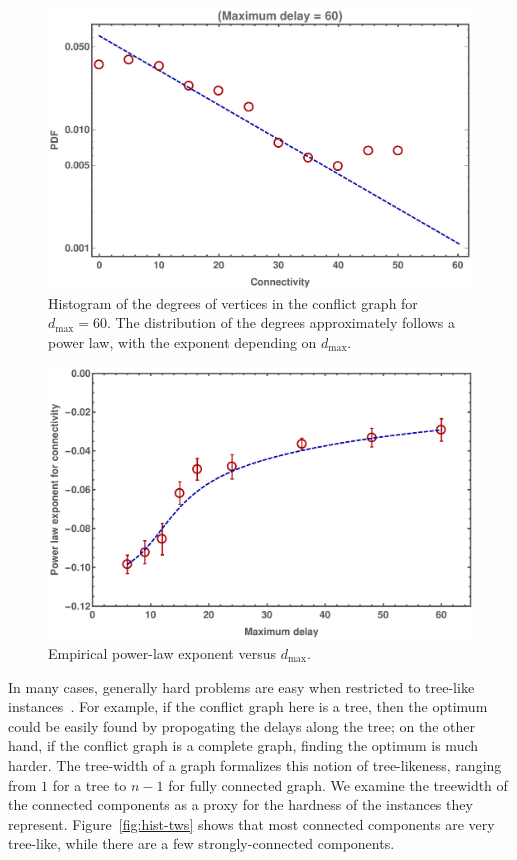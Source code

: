 \begin{figure}[h]
\includegraphics[width=0.95\columnwidth]{pics/instances/connectivity_pdf.pdf}
\caption[Histogram of degrees]{Histogram of the degrees of vertices in the conflict graph for $d_{\max} = 60$. 
The distribution of the degrees approximately follows a power law, with the exponent depending on $d_{\max}$.
}
\label{fig:hist-degree}
\end{figure}

\begin{figure}[h]
\includegraphics[width=0.95\columnwidth]{pics/instances/connectivity_pl.pdf}
\caption[Power-law exponent vs. $d_{\max}$]{Empirical power-law exponent versus $d_{\max}$.}
\label{fig:exponent-vs-dmax}
\end{figure}

In many cases, generally hard problems are easy when restricted to tree-like instances~\cite{bertele1972, halin1976s}.
For example, if the conflict graph here is a tree, then the optimum could be easily found by propogating the delays along the tree;
on the other hand, if the conflict graph is a complete graph, finding the optimum is much harder.
The tree-width of a graph formalizes this notion of tree-likeness, ranging from $1$ for a tree to $n-1$ for fully connected graph.
We examine the treewidth of the connected components as a proxy for the hardness of the instances they represent.
Figure~\ref{fig:hist-tws} shows that most connected components are very tree-like, while there are a few strongly-connected components.


